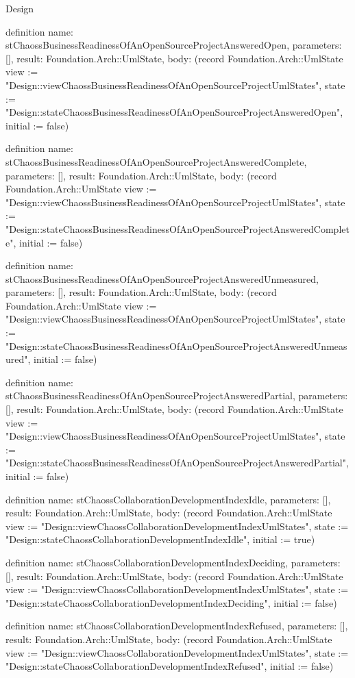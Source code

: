 \begin{lexlean}{Design}
\begin{semanticmodule}
definition{
  name: stChaossBusinessReadinessOfAnOpenSourceProjectAnsweredOpen,
  parameters: [],
  result: Foundation.Arch::UmlState,
  body: (record Foundation.Arch::UmlState {view := "Design::viewChaossBusinessReadinessOfAnOpenSourceProjectUmlStates", state := "Design::stateChaossBusinessReadinessOfAnOpenSourceProjectAnsweredOpen", initial := false})
}

definition{
  name: stChaossBusinessReadinessOfAnOpenSourceProjectAnsweredComplete,
  parameters: [],
  result: Foundation.Arch::UmlState,
  body: (record Foundation.Arch::UmlState {view := "Design::viewChaossBusinessReadinessOfAnOpenSourceProjectUmlStates", state := "Design::stateChaossBusinessReadinessOfAnOpenSourceProjectAnsweredComplete", initial := false})
}

definition{
  name: stChaossBusinessReadinessOfAnOpenSourceProjectAnsweredUnmeasured,
  parameters: [],
  result: Foundation.Arch::UmlState,
  body: (record Foundation.Arch::UmlState {view := "Design::viewChaossBusinessReadinessOfAnOpenSourceProjectUmlStates", state := "Design::stateChaossBusinessReadinessOfAnOpenSourceProjectAnsweredUnmeasured", initial := false})
}

definition{
  name: stChaossBusinessReadinessOfAnOpenSourceProjectAnsweredPartial,
  parameters: [],
  result: Foundation.Arch::UmlState,
  body: (record Foundation.Arch::UmlState {view := "Design::viewChaossBusinessReadinessOfAnOpenSourceProjectUmlStates", state := "Design::stateChaossBusinessReadinessOfAnOpenSourceProjectAnsweredPartial", initial := false})
}

definition{
  name: stChaossCollaborationDevelopmentIndexIdle,
  parameters: [],
  result: Foundation.Arch::UmlState,
  body: (record Foundation.Arch::UmlState {view := "Design::viewChaossCollaborationDevelopmentIndexUmlStates", state := "Design::stateChaossCollaborationDevelopmentIndexIdle", initial := true})
}

definition{
  name: stChaossCollaborationDevelopmentIndexDeciding,
  parameters: [],
  result: Foundation.Arch::UmlState,
  body: (record Foundation.Arch::UmlState {view := "Design::viewChaossCollaborationDevelopmentIndexUmlStates", state := "Design::stateChaossCollaborationDevelopmentIndexDeciding", initial := false})
}

definition{
  name: stChaossCollaborationDevelopmentIndexRefused,
  parameters: [],
  result: Foundation.Arch::UmlState,
  body: (record Foundation.Arch::UmlState {view := "Design::viewChaossCollaborationDevelopmentIndexUmlStates", state := "Design::stateChaossCollaborationDevelopmentIndexRefused", initial := false})
}


\end{semanticmodule}
\end{lexlean}
